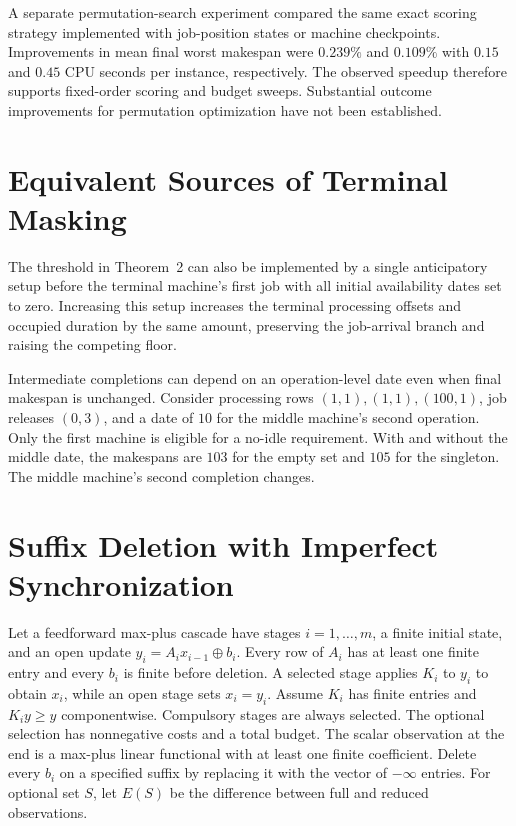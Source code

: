 \documentclass[11pt,letterpaper]{article}
\begin{document}
A separate permutation-search experiment compared the same exact scoring strategy implemented with job-position states or machine checkpoints. Improvements in mean final worst makespan were $0.239\%$ and $0.109\%$ with $0.15$ and $0.45$ CPU seconds per instance, respectively. The observed speedup therefore supports fixed-order scoring and budget sweeps. Substantial outcome improvements for permutation optimization have not been established.

\section{Equivalent Sources of Terminal Masking}
\label{app:masking}

The threshold in Theorem~2 can also be implemented by a single anticipatory setup before the terminal machine's first job with all initial availability dates set to zero. Increasing this setup increases the terminal processing offsets and occupied duration by the same amount, preserving the job-arrival branch and raising the competing floor.

Intermediate completions can depend on an operation-level date even when final makespan is unchanged. Consider processing rows $(1,1),(1,1),(100,1)$, job releases $(0,3)$, and a date of $10$ for the middle machine's second operation. Only the first machine is eligible for a no-idle requirement. With and without the middle date, the makespans are $103$ for the empty set and $105$ for the singleton. The middle machine's second completion changes.

\section{Suffix Deletion with Imperfect Synchronization}
\label{app:sync_suffix}

Let a feedforward max-plus cascade have stages $i=1,\ldots,m$, a finite initial state, and an open update $y_i=A_i x_{i-1}\oplus b_i$. Every row of $A_i$ has at least one finite entry and every $b_i$ is finite before deletion. A selected stage applies $K_i$ to $y_i$ to obtain $x_i$, while an open stage sets $x_i=y_i$. Assume $K_i$ has finite entries and $K_i y\ge y$ componentwise. Compulsory stages are always selected. The optional selection has nonnegative costs and a total budget. The scalar observation at the end is a max-plus linear functional with at least one finite coefficient. Delete every $b_i$ on a specified suffix by replacing it with the vector of $-\infty$ entries. For optional set $S$, let $E(S)$ be the difference between full and reduced observations.
\end{document}
